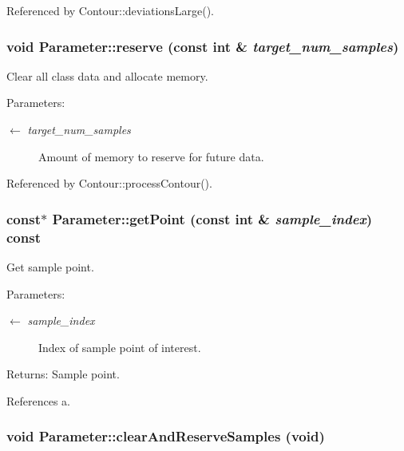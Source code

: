 Referenced by Contour::deviationsLarge().\hypertarget{classParameter_8db6db4bd306208ccfbf94ef04d39955}{
\subsubsection[reserve]{\setlength{\rightskip}{0pt plus 5cm}void Parameter::reserve (const int \& {\em target\_\-num\_\-samples})}}
\label{classParameter_8db6db4bd306208ccfbf94ef04d39955}


Clear all class data and allocate memory. \begin{Desc}
\item[Parameters:]
\begin{description}
\item[\mbox{$\leftarrow$} {\em target\_\-num\_\-samples}]Amount of memory to reserve for future data. \end{description}
\end{Desc}


Referenced by Contour::processContour().\hypertarget{classParameter_21bfc1fa9f7999cd18429493fef88485}{
\subsubsection[getPoint]{ const$\ast$ Parameter::getPoint (const int \& {\em sample\_\-index}) const}}
\label{classParameter_21bfc1fa9f7999cd18429493fef88485}


Get sample point. \begin{Desc}
\item[Parameters:]
\begin{description}
\item[\mbox{$\leftarrow$} {\em sample\_\-index}]Index of sample point of interest. \end{description}
\end{Desc}
\begin{Desc}
\item[Returns:]Sample point. \end{Desc}


References a.\hypertarget{classParameter_90c14f9388c291ebd0199b542ea3eaa2}{
\subsubsection[clearAndReserveSamples]{\setlength{\rightskip}{0pt plus 5cm}void Parameter::clearAndReserveSamples (void)}}
\label{classParameter_90c14f9388c291ebd0199b542ea3eaa2}



